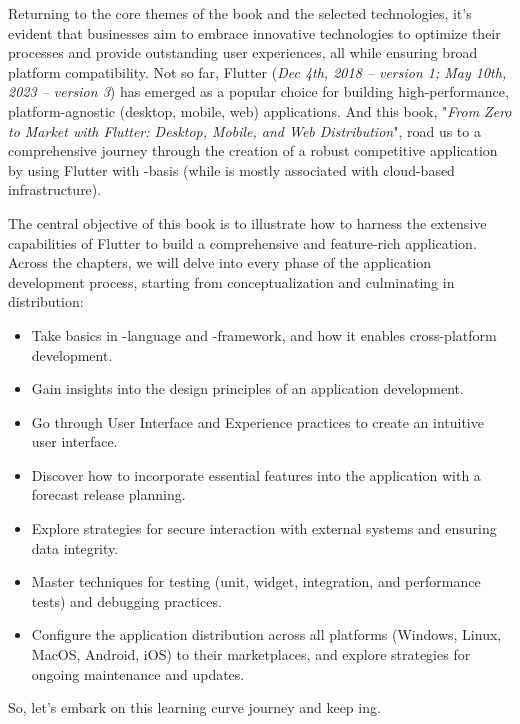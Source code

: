 Returning to the core themes of the book and the selected technologies, it's evident that businesses aim to embrace 
innovative technologies to optimize their processes and provide outstanding user experiences, all while ensuring 
broad platform compatibility. Not so far, Flutter (\emph{Dec 4th, 2018 -- version 1; May 10th, 2023 -- version 3}) 
has emerged as a popular choice for building high-performance, platform-agnostic (desktop, mobile, web) applications. 
And this book, "\emph{From Zero to Market with Flutter: Desktop, Mobile, and Web Distribution}", road us to a 
comprehensive journey through the creation of a robust competitive application by using Flutter with 
-basis (while  is mostly associated with cloud-based infrastructure).

The central objective of this book is to illustrate how to harness the extensive capabilities of Flutter to build a 
comprehensive and feature-rich application. Across the chapters, we will delve into every phase of the application 
development process, starting from conceptualization and culminating in distribution:

\begin{itemize}
    \item Take basics in -language and -framework, and how it enables cross-platform development.

    \item Gain insights into the design principles of an application development. 
    
    \item Go through User Interface and Experience practices to create an intuitive user interface.

    \item Discover how to incorporate essential features into the application with a forecast release planning.

    \item Explore strategies for secure interaction with external systems and ensuring data integrity.

    \item Master techniques for testing (unit, widget, integration, and performance tests) and debugging practices. 

    \item Configure the application distribution across all platforms (Windows, Linux, MacOS, Android, iOS) to their 
    marketplaces, and explore strategies for ongoing maintenance and updates.
\end{itemize}

\noindent So, let's embark on this learning curve journey and keep ing.